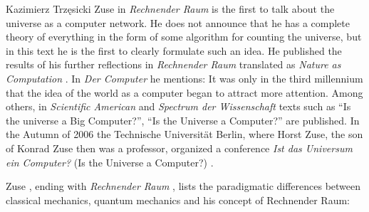 \begin{artengenv}{Kazimierz Trzęsicki}
 Zuse in \emph{Rechnender Raum} \parencite*{Zuse1967} is the first to talk about the universe as a computer network. He does not announce that he has a complete theory of everything in the form of some algorithm for counting the universe, but in this text he is the first to clearly formulate such an idea. He published the results of his further reflections in \emph{Rechnender Raum} \parencite*{Zuse1969} translated as \emph{Nature as Computation} \parencite* {Zuse2012}. In \emph {Der Computer} \parencite* {Zuse2010} he mentions: 
 It was only in the third millennium that the idea of the world as a computer began to attract more attention. Among others, in \emph{Scientific American} and \emph{Spectrum der Wissenschaft} texts such as ``Is the universe a Big Computer?'', ``Is the Universe a Computer?'' are published. In the Autumn of 2006 the Technische Universit{\"a}t Berlin, where Horst Zuse, the son of Konrad Zuse then was a professor, organized a conference \emph{Ist das Universum ein Computer?} (Is the Universe a Computer?) \parencite[p.61]{German2012}.

Zuse \parencite*[p.56]{Zuse2012a}, ending with \emph{Rechnender Raum} \parencite*[p.344]{Zuse1967}, lists the paradigmatic differences between classical mechanics, quantum mechanics and his concept of Rechnender Raum:


\end{artengenv}
